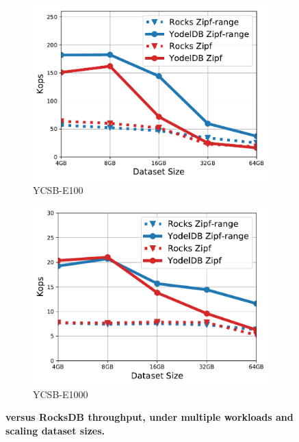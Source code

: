 \begin{figure}[tb]
\begin{subfigure}{0.3\linewidth}
\end{subfigure}
\begin{subfigure}{0.3\linewidth}
\includegraphics[width=\textwidth]{figs/Workload_E_line.pdf}
\caption{YCSB-E100}
\label{fig:throughput:e100}
\end{subfigure}
\begin{subfigure}{0.3\linewidth}
\includegraphics[width=\textwidth]{figs/Workload_E+_line.pdf}
\caption{YCSB-E1000}
\label{fig:throughput:e1000}
\end{subfigure}
\caption{\bf{\sys\/ versus RocksDB throughput, under multiple workloads and scaling dataset sizes.}}
\label{fig:throughput}
\end{figure}

